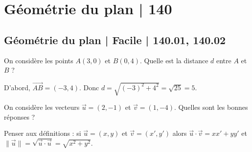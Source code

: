 



\section{Géométrie du plan | 140}


\subsection{Géométrie du plan | Facile | 140.01, 140.02}

\begin{question}

On considère les points $A(3,0)$ et $B(0,4)$. Quelle est la distance $d$ entre $A$ et $B$ ?
\begin{answers}  
\end{answers}
\begin{explanations}
D'abord, $\overrightarrow{AB}=(-3,4)$. Donc $d=\sqrt{(-3)^2+4^2}=\sqrt{25}=5$.
\end{explanations}
\end{question}

\begin{question}

On considère les vecteurs $\vec{u}=(2,-1)$ et $\vec{v}=(1,-4)$. Quelles sont les bonnes réponses ?
\begin{answers}  
\end{answers}
\begin{explanations}
Penser aux définitions : si $\vec{u}=(x,y)$ et $\vec{v}=(x',y')$ alors
$\vec{u}\cdot \vec{v} = xx'+yy'$ et $\|\vec{u}\| = \sqrt{\vec{u}\cdot \vec{u}}
= \sqrt{x^2+y^2}$.
\end{explanations}
\end{question}


